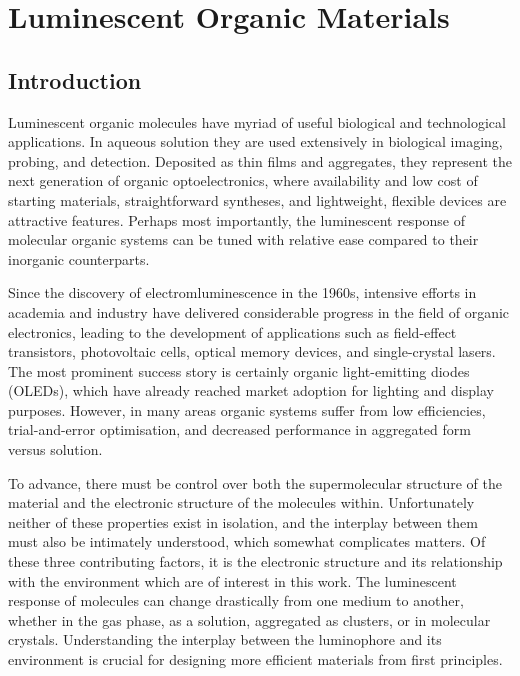 \chapter{Luminescent Organic Materials}
\label{chapter: luminscent organic materials}
\section{Introduction}\label{section: lom introduction}
Luminescent organic molecules have myriad of useful biological and technological applications. In aqueous solution they are used extensively in biological imaging, probing, and detection. Deposited as thin films and aggregates, they represent the next generation of organic optoelectronics, where availability and low cost of starting materials, straightforward syntheses, and lightweight, flexible devices are attractive features. Perhaps most importantly, the luminescent response of molecular organic systems can be tuned with relative ease compared to their inorganic counterparts.

Since the discovery of electromluminescence in the 1960s, intensive efforts in academia and industry have delivered considerable progress in the field of organic electronics, leading to  the development of applications such as field-effect transistors, photovoltaic cells, optical memory devices, and single-crystal lasers.\cite{Ostroverkhova2016} The most prominent success story is certainly organic light-emitting diodes (OLEDs), which have already reached market adoption for lighting and display purposes. However, in many areas organic systems suffer from low efficiencies, trial-and-error optimisation, and decreased performance in aggregated form versus solution. 

To advance, there must be control over both the supermolecular structure of the material and the electronic structure of the  molecules within.  Unfortunately neither of these properties exist in isolation, and the interplay between them must also be intimately understood, which somewhat complicates matters. Of these three contributing factors, it is the electronic structure and its relationship with the environment which are of interest in this work. The luminescent response of molecules can change drastically from one medium to another, whether in the gas phase, as a solution, aggregated as clusters, or in molecular crystals. Understanding the interplay between the luminophore and its environment is crucial for designing more efficient materials from first principles. 

